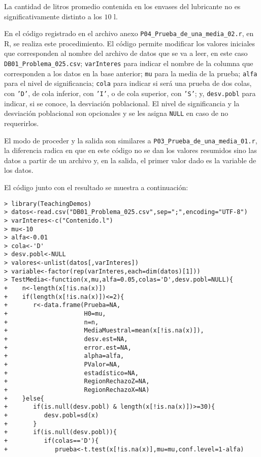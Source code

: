\begin{solucion}
 \begin{conclusion}
  La cantidad de litros promedio contenida en los envases del lubricante no es significativamente distinto a los $10$ l.
 \end{conclusion}
 En el c\'odigo registrado en el archivo anexo \texttt{P04\_Prueba\_de\_una\_media\_02.r}, en R, se realiza este procedimiento. El c\'odigo permite modificar los valores iniciales que corresponden al nombre del archivo de datos que se va a leer, en este caso \texttt{DB01\_Problema\_025.csv}; \texttt{varInteres} para indicar el nombre de la columna que corresponden a los datos en la base anterior; \texttt{mu} para la media de la prueba; \texttt{alfa} para el nivel de significancia; \texttt{cola} para indicar si ser\'a una prueba de dos colas, con \texttt{'D'}, de cola inferior, con \texttt{'I'}, o de cola superior, con \texttt{'S'}; y, \texttt{desv.pobl} para indicar, si se conoce, la desviaci\'on poblacional. El nivel de significancia y la desviaci\'on poblacional son opcionales y se les asigna \texttt{NULL} en caso de no requerirlos.
 \par 
 El modo de proceder y la salida son similares a \texttt{P03\_Prueba\_de\_una\_media\_01.r}, la diferencia radica en que en este c\'odigo no se dan los valores resumidos sino las datos a partir de un archivo y, en la salida, el primer valor dado es la variable de los datos.
 \par 
 El c\'odigo junto con el resultado se muestra a continuaci\'on:
 \begin{verbatim}
> library(TeachingDemos)
> datos<-read.csv("DB01_Problema_025.csv",sep=";",encoding="UTF-8")
> varInteres<-c("Contenido.l")
> mu<-10
> alfa<-0.01
> cola<-'D'
> desv.pobl<-NULL
> valores<-unlist(datos[,varInteres])
> variable<-factor(rep(varInteres,each=dim(datos)[1]))
> TestMedia<-function(x,mu,alfa=0.05,colas='D',desv.pobl=NULL){
+    n<-length(x[!is.na(x)])
+    if(length(x[!is.na(x)])<=2){
+       r<-data.frame(Prueba=NA,
+                     H0=mu,
+                     n=n,
+                     MediaMuestral=mean(x[!is.na(x)]),
+                     desv.est=NA,
+                     error.est=NA,
+                     alpha=alfa,
+                     PValor=NA,
+                     estadístico=NA,
+                     RegionRechazoZ=NA,
+                     RegionRechazoX=NA)
+    }else{
+       if(is.null(desv.pobl) & length(x[!is.na(x)])>=30){
+          desv.pobl=sd(x)
+       }
+       if(is.null(desv.pobl)){
+          if(colas=='D'){
+             prueba<-t.test(x[!is.na(x)],mu=mu,conf.level=1-alfa)

\end{verbatim}
\end{solucion}
